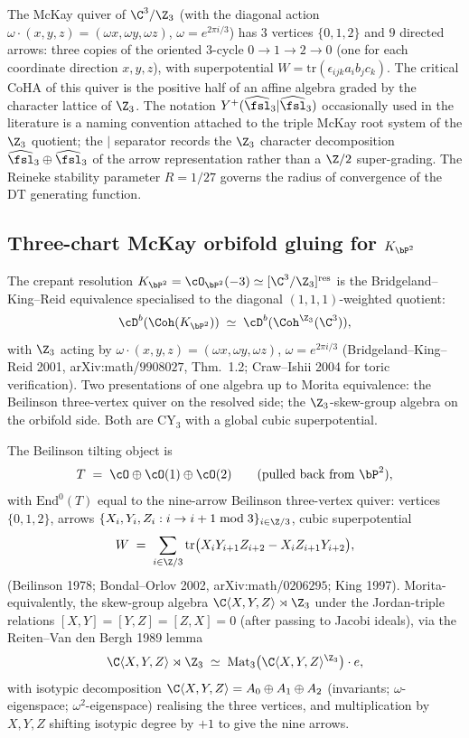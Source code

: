 \begin{remark}
\label{rem:local-p2-mckay}
The McKay quiver of $\C^3/\Z_3$ (with the diagonal action $\omega \cdot (x,y,z) = (\omega x, \omega y, \omega z)$, $\omega = e^{2\pi i/3}$) has $3$ vertices $\{0,1,2\}$ and $9$ directed arrows: three copies of the oriented $3$-cycle $0 \to 1 \to 2 \to 0$ (one for each coordinate direction $x,y,z$), with superpotential $W = \mathrm{tr}(\epsilon_{ijk} a_i b_j c_k)$. The critical CoHA of this quiver is the positive half of an affine algebra graded by the character lattice of $\Z_3$. The notation $Y^+(\widehat{\fsl}_3 | \widehat{\fsl}_3)$ occasionally used in the literature is a naming convention attached to the triple McKay root system of the $\Z_3$ quotient; the $|$ separator records the $\Z_3$ character decomposition $\widehat{\fsl}_3 \oplus \widehat{\fsl}_3$ of the arrow representation rather than a $\Z/2$ super-grading. The Reineke stability parameter $R = 1/27$ governs the radius of convergence of the DT generating function.
\end{remark}

\subsection{Three-chart McKay orbifold gluing for \texorpdfstring{$K_{\bP^2}$}{K-P-2}}
\label{subsec:local-p2-mckay-orbifold-gluing}

The crepant resolution $K_{\bP^2} = \cO_{\bP^2}(-3) \simeq [\C^3/\Z_3]^{\mathrm{res}}$ is the Bridgeland--King--Reid equivalence specialised to the diagonal $(1,1,1)$-weighted quotient:
\[
 \cD^b(\Coh(K_{\bP^2})) \;\simeq\; \cD^b(\Coh^{\Z_3}(\C^3)),
\]
with $\Z_3$ acting by $\omega \cdot (x, y, z) = (\omega x, \omega y, \omega z)$, $\omega = e^{2\pi i/3}$ (Bridgeland--King--Reid 2001, arXiv:math/$9908027$, Thm.~1.2; Craw--Ishii 2004 for toric verification). Two presentations of one algebra up to Morita equivalence: the Beilinson three-vertex quiver on the resolved side; the $\Z_3$-skew-group algebra on the orbifold side. Both are CY$_3$ with a global cubic superpotential.

The Beilinson tilting object is
\[
 T \;=\; \cO \oplus \cO(1) \oplus \cO(2) \qquad (\text{pulled back from } \bP^2),
\]
with $\mathrm{End}^0(T)$ equal to the nine-arrow Beilinson three-vertex quiver: vertices $\{0, 1, 2\}$, arrows $\{X_i, Y_i, Z_i : i \to i+1 \bmod 3\}_{i \in \Z/3}$, cubic superpotential
\[
 W \;=\; \sum_{i \in \Z/3} \mathrm{tr}\bigl(X_i Y_{i+1} Z_{i+2} - X_i Z_{i+1} Y_{i+2}\bigr),
\]
(Beilinson 1978; Bondal--Orlov 2002, arXiv:math/$0206295$; King 1997). Morita-equivalently, the skew-group algebra $\C\langle X, Y, Z\rangle \rtimes \Z_3$ under the Jordan-triple relations $[X, Y] = [Y, Z] = [Z, X] = 0$ (after passing to Jacobi ideals), via the Reiten--Van den Bergh 1989 lemma
\[
 \C\langle X, Y, Z\rangle \rtimes \Z_3 \;\simeq\; \mathrm{Mat}_3\bigl(\C\langle X, Y, Z\rangle^{\Z_3}\bigr) \cdot e,
\]
with isotypic decomposition $\C\langle X, Y, Z\rangle = A_0 \oplus A_1 \oplus A_2$ (invariants; $\omega$-eigenspace; $\omega^2$-eigenspace) realising the three vertices, and multiplication by $X, Y, Z$ shifting isotypic degree by $+1$ to give the nine arrows.

